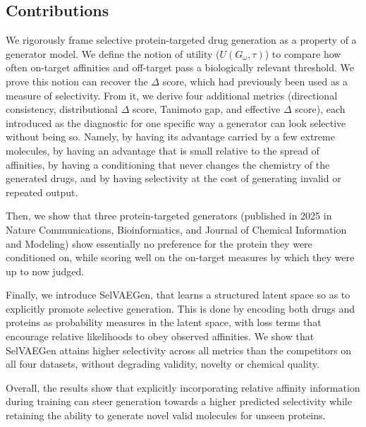 \documentclass[a4paper,12pt]{article}
\begin{document}
\subsection{Contributions}
We rigorously frame selective protein-targeted drug generation
as a property of a generator model. We define the notion of utility ($U(G_\omega,\tau)$) to compare how often on-target affinities
and off-target pass a biologically relevant threshold. We prove this notion can recover the $\Delta$ score, which had previously been used as a measure of selectivity.
From it, we derive four additional metrics (directional consistency, distributional $\Delta$ score, Tanimoto gap, and effective $\Delta$ score), each introduced as
the diagnostic for one specific way a generator can look selective without being so. Namely, by having its advantage carried by a few extreme molecules, by having an advantage that is small relative to the
spread of affinities, by having a conditioning that never changes the chemistry of the generated drugs, and by having selectivity at the cost of generating invalid or repeated output.

Then, we show that three
protein-targeted generators (published in 2025 in Nature Communications, Bioinformatics, and Journal of Chemical Information and Modeling) show essentially no preference for
the protein they were conditioned on, while scoring well on the on-target measures
by which they were up to now judged.

Finally, we introduce SelVAEGen,
that learns a structured latent space so as to explicitly promote selective generation.
This is done by encoding both drugs and proteins as probability measures in the
latent space, with loss terms that encourage relative likelihoods to obey observed affinities.
We show that SelVAEGen attains higher selectivity across all metrics
than the competitors on all four datasets, without degrading validity, novelty or
chemical quality.

Overall, the results show that explicitly incorporating relative affinity information
during training can steer generation towards a higher predicted selectivity while
retaining the ability to generate novel valid molecules for unseen proteins.
\end{document}
